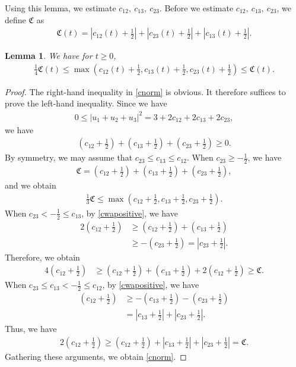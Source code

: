 \documentclass[reqno]{amsart}
\theoremstyle{plain}
\newtheorem{lemma}[theorem]{Lemma}
\theoremstyle{definition}
\numberwithin{equation}{section}
\newcommand{\1}{\mathbbm{1}}
\begin{document}
Using this lemma, we estimate $c_{12},\ c_{13},\ c_{23}$. Before we estimate $c_{12},\ c_{13},\ c_{23}$, we define $\mathfrak{C}$ as
\begin{align}\label{cookisa}
\mathfrak{C}(t)=\left|c_{12}(t)+\frac{1}{2}\right|+\left|c_{23}(t)+\frac{1}{2}\right|+\left|c_{13}(t)+\frac{1}{2}\right|.
\end{align}
\begin{lemma}\label{0213lemma}
We have for $t\geq 0$,
\begin{align}\label{cnorm}
\frac{1}{4}\mathfrak{C}(t)\leq \max{\left(c_{12}(t)+\frac{1}{2},c_{13}(t)+\frac{1}{2},c_{23}(t)+\frac{1}{2}\right)}\leq \mathfrak{C}(t).
\end{align}
\end{lemma}
\begin{proof}
The right-hand inequality in \eqref{cnorm} is obvious. It therefore suffices to prove the left-hand inequality. Since we have
\begin{align*}
0\leq |u_1+u_2+u_3|^2=3+2c_{12}+2c_{13}+2c_{23},
\end{align*}
we have
\begin{align}\label{cwapositive}
\left(c_{12}+\frac{1}{2}\right)+\left(c_{13}+\frac{1}{2}\right)+\left(c_{23}+\frac{1}{2}\right)\geq 0.
\end{align}
By symmetry, we may assume that $c_{23}\leq c_{13}\leq c_{12}$. When $c_{23}\geq -\frac{1}{2}$, we have
\begin{align*}
\mathfrak{C}=\left(c_{12}+\frac{1}{2}\right)+\left(c_{13}+\frac{1}{2}\right)+\left(c_{23}+\frac{1}{2}\right),
\end{align*}
and we obtain
\begin{align*}
\frac{1}{3}\mathfrak{C}\leq \max{\left(c_{12}+\frac{1}{2},c_{13}+\frac{1}{2},c_{23}+\frac{1}{2}\right)}.
\end{align*}
When $c_{23}<-\frac{1}{2}\leq c_{13}$, by \eqref{cwapositive}, we have
\begin{align*}
2\left(c_{12}+\frac{1}{2}\right)&\geq \left(c_{12}+\frac{1}{2}\right)+\left(c_{13}+\frac{1}{2}\right)
\\
&\geq -\left(c_{23}+\frac{1}{2}\right)=\left| c_{23}+\frac{1}{2}\right|. 
\end{align*}
Therefore, we obtain
\begin{align*}
4\left(c_{12}+\frac{1}{2}\right)&\geq \left(c_{12}+\frac{1}{2}\right)+\left(c_{13}+\frac{1}{2}\right)+2\left(c_{12}+\frac{1}{2}\right)\geq \mathfrak{C}.
\end{align*}
When  $c_{23}\leq c_{13}<-\frac{1}{2}\leq c_{12}$, by \eqref{cwapositive}, we have
\begin{align*}
\left(c_{12}+\frac{1}{2}\right)&\geq -\left(c_{13}+\frac{1}{2}\right)-\left(c_{23}+\frac{1}{2}\right)
\\
&=\left|c_{13}+\frac{1}{2}\right|+\left|c_{23}+\frac{1}{2}\right|.
\end{align*}
Thus, we have
\begin{align*}
2\left(c_{12}+\frac{1}{2}\right)\geq \left(c_{12}+\frac{1}{2}\right)+\left|c_{13}+\frac{1}{2}\right|+\left|c_{23}+\frac{1}{2}\right|=\mathfrak{C}.
\end{align*}
Gathering these arguments, we obtain \eqref{cnorm}.
\end{proof}
\end{document}

